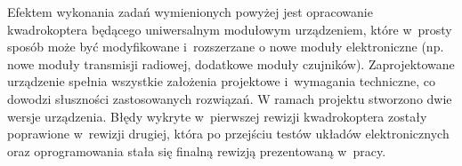 Efektem wykonania zadań wymienionych powyżej jest opracowanie kwadrokoptera będącego uniwersalnym modułowym urządzeniem, które w~prosty sposób może być modyfikowane i~rozszerzane o nowe moduły elektroniczne (np. nowe moduły transmisji radiowej, dodatkowe moduły czujników). 
Zaprojektowane urządzenie spełnia wszystkie założenia projektowe i~wymagania techniczne, co dowodzi słuszności zastosowanych rozwiązań.
W ramach projektu stworzono dwie wersje urządzenia. Błędy wykryte w~pierwszej rewizji kwadrokoptera zostały poprawione w~rewizji drugiej, która po przejściu testów układów elektronicznych oraz oprogramowania stała się finalną rewizją prezentowaną w~pracy. 

